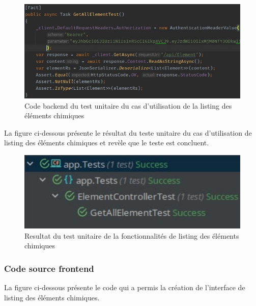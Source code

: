 \begin{figure}[H]
	\centering
	\includegraphics[width=1\textwidth]{img/utetlist2}
	\caption{Code backend du test unitaire du cas d'utilisation de la listing des éléments chimiques}
\end{figure}

La figure ci-dessous présente le résultat du teste unitaire du cas d'utilisation de listing des éléments chimiques et revèle que le teste est concluent.

\begin{figure}[H]
	\centering
	\includegraphics[width=1\textwidth]{img/utetlist}
	\caption{Resultat du test unitaire de la fonctionnalités de listing des éléments chimiques}
\end{figure}

\subsubsection{Code source frontend}

La figure ci-dessous présente le code qui a permis la création de l'interface de listing des éléments chimiques.

